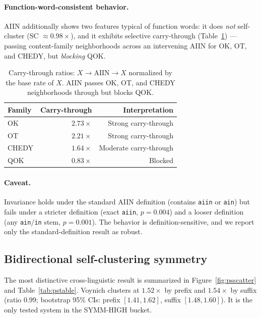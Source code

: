 \documentclass[11pt]{article}
\begin{document}
\paragraph{Function-word-consistent behavior.} AIIN additionally shows two
features typical of function words: it does \emph{not} self-cluster
(SC $\approx 0.98\times$), and it exhibits selective carry-through
(Table~\ref{tab:carry}) --- passing content-family neighborhoods across an
intervening AIIN for OK, OT, and CHEDY, but \emph{blocking} QOK.

\begin{table}[ht]
  \centering
  \caption{Carry-through ratios: $X \to \text{AIIN} \to X$ normalized by the
  base rate of $X$. AIIN passes OK, OT, and CHEDY neighborhoods through but
  blocks QOK.}
  \label{tab:carry}
  \begin{tabular}{lrr}
    \toprule
    Family & Carry-through & Interpretation \\
    \midrule
    OK    & $2.73\times$ & Strong carry-through \\
    OT    & $2.21\times$ & Strong carry-through \\
    CHEDY & $1.64\times$ & Moderate carry-through \\
    QOK   & $0.83\times$ & Blocked \\
    \bottomrule
  \end{tabular}
\end{table}

\paragraph{Caveat.} Invariance holds under the standard AIIN definition
(contains \texttt{aiin} or \texttt{ain}) but fails under a stricter
definition (exact \texttt{aiin}, $p = 0.004$) and a looser definition
(any \texttt{ain}/\texttt{in} stem, $p = 0.001$). The behavior is
definition-sensitive, and we report only the standard-definition result
as robust.

\subsection{Bidirectional self-clustering symmetry}
\label{sec:symmetry}

The most distinctive cross-linguistic result is summarized in
Figure~\ref{fig:psscatter} and Table~\ref{tab:pstable}. Voynich clusters at
$1.52\times$ by prefix and $1.54\times$ by suffix (ratio $0.99$; bootstrap
95\% CIs: prefix $[1.41, 1.62]$, suffix $[1.48, 1.60]$). It is the only
tested system in the SYMM-HIGH bucket.
\end{document}
